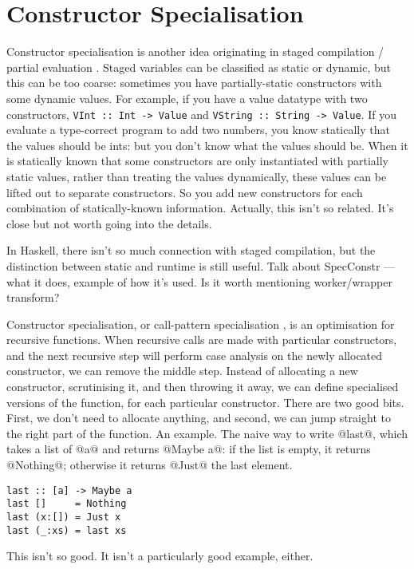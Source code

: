 \section{Constructor Specialisation}
Constructor specialisation is another idea originating in staged compilation / partial evaluation \cite{mogensen1993constructor}.
Staged variables can be classified as static or dynamic, but this can be too coarse: sometimes you have partially-static constructors with some dynamic values.
For example, if you have a value datatype with two constructors, \lstinline/VInt :: Int -> Value/ and \lstinline/VString :: String -> Value/.
If you evaluate a type-correct program to add two numbers, you know statically that the values should be ints: but you don't know what the values should be.
When it is statically known that some constructors are only instantiated with partially static values, rather than treating the values dynamically, these values can be lifted out to separate constructors.
So you add new constructors for each combination of statically-known information.
Actually, this isn't so related. It's close but not worth going into the details.

In Haskell, there isn't so much connection with staged compilation, but the distinction between static and runtime is still useful.
Talk about SpecConstr --- what it does, example of how it's used.
Is it worth mentioning worker/wrapper transform?

Constructor specialisation, or call-pattern specialisation \cite{peyton2007call}, is an optimisation for recursive functions.
When recursive calls are made with particular constructors, and the next recursive step will perform case analysis on the newly allocated constructor, we can remove the middle step.
Instead of allocating a new constructor, scrutinising it, and then throwing it away, we can define specialised versions of the function, for each particular constructor.
There are two good bits. First, we don't need to allocate anything, and second, we can jump straight to the right part of the function.
An example.
The naive way to write @last@, which takes a list of @a@ and returns @Maybe a@: if the list is empty, it returns @Nothing@; otherwise it returns @Just@ the last element.

\begin{lstlisting}
last :: [a] -> Maybe a
last []     = Nothing
last (x:[]) = Just x
last (_:xs) = last xs
\end{lstlisting}

This isn't so good.
It isn't a particularly good example, either.

